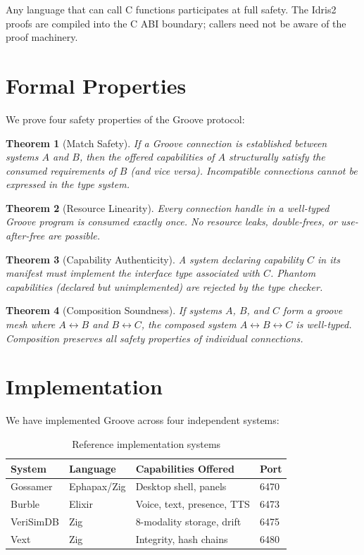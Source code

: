 \documentclass[11pt,a4paper]{article}
\newtheorem{theorem}{Theorem}
\begin{document}
Any language that can call C functions participates at full safety. The
Idris2 proofs are compiled into the C ABI boundary; callers need not be
aware of the proof machinery.

\section{Formal Properties}

We prove four safety properties of the Groove protocol:

\begin{theorem}[Match Safety]
If a Groove connection is established between systems $A$ and $B$, then
the offered capabilities of $A$ structurally satisfy the consumed
requirements of $B$ (and vice versa). Incompatible connections cannot be
expressed in the type system.
\end{theorem}

\begin{theorem}[Resource Linearity]
Every connection handle in a well-typed Groove program is consumed exactly
once. No resource leaks, double-frees, or use-after-free are possible.
\end{theorem}

\begin{theorem}[Capability Authenticity]
A system declaring capability $C$ in its manifest must implement the
interface type associated with $C$. Phantom capabilities (declared but
unimplemented) are rejected by the type checker.
\end{theorem}

\begin{theorem}[Composition Soundness]
If systems $A$, $B$, and $C$ form a groove mesh where $A \leftrightarrow B$
and $B \leftrightarrow C$, the composed system $A \leftrightarrow B
\leftrightarrow C$ is well-typed. Composition preserves all safety
properties of individual connections.
\end{theorem}

\section{Implementation}
\label{sec:implementation}

We have implemented Groove across four independent systems:

\begin{table}[h]
\centering
\begin{tabular}{llll}
\toprule
System & Language & Capabilities Offered & Port \\
\midrule
Gossamer & Ephapax/Zig & Desktop shell, panels & 6470 \\
Burble & Elixir & Voice, text, presence, TTS & 6473 \\
VeriSimDB & Zig & 8-modality storage, drift & 6475 \\
Vext & Zig & Integrity, hash chains & 6480 \\
\bottomrule
\end{tabular}
\caption{Reference implementation systems}
\end{table}
\end{document}

